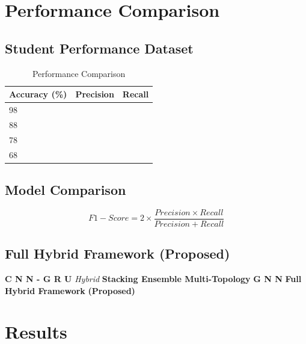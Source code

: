 \documentclass[twocolumn]{svjour3}
\begin{document}
\section{Performance Comparison}
\subsection{Student Performance Dataset}
\begin{table}
\centering
\caption{Performance Comparison}
\begin{tabular}{lll}
\hline
Accuracy (\%) & Precision & Recall \\
\hline
98 & & \\
88 & & \\
78 & & \\
68 & & \\
\hline
\end{tabular}
\end{table}
\subsection{Model Comparison}
\begin{equation}
F1-Score = 2 \times \frac{Precision \times Recall}{Precision + Recall}
\end{equation}
\subsection{Full Hybrid Framework (Proposed)}
\textbf{C N N - G R U} \textit{Hybrid} \textbf{Stacking Ensemble Multi-Topology} 
\textbf{G N N} 
\textbf{Full Hybrid Framework} \textbf{(Proposed)}

\section{Results}
\end{document}
